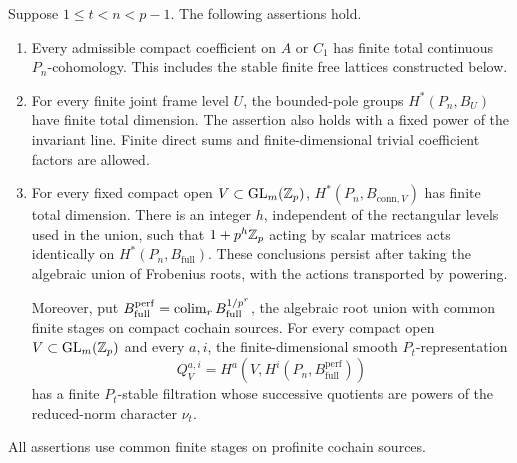 \begin{theorem}\label{thm:coefficient-finiteness}
Suppose $1\leq t<n<p-1$.  The following assertions hold.
\begin{enumerate}
\item Every admissible compact coefficient on $A$ or $C_1$ has finite
total continuous $P_n$-cohomology.  This includes the stable finite free
lattices constructed below.
\item For every finite joint frame level $U$, the bounded-pole groups
$H^*(P_n,B_U)$ have finite total dimension.  The assertion also
holds with a fixed power of the invariant line.  Finite direct
sums and finite-dimensional trivial coefficient factors are
allowed.
\item For every fixed compact open $V\subset\operatorname{GL}_m(\mathbb Z_p)$,
$H^*(P_n,B_{\mathrm{conn},V})$ has finite total dimension.  There is an
integer $h$, independent of the rectangular levels used in the union,
such that $1+p^h\mathbb Z_p$ acting by scalar matrices acts identically on
$H^*(P_n,B_{\mathrm{full}})$.  These conclusions persist after taking the
algebraic union of Frobenius roots, with the actions transported by
powering.

Moreover, put
$B_{\mathrm{full}}^{\mathrm{perf}}
 =\operatorname*{colim}_r B_{\mathrm{full}}^{1/p^r}$, the algebraic root union
with common finite stages on compact cochain sources.
For every compact open $V\subset\operatorname{GL}_m(\mathbb Z_p)$ and every $a,i$,
the finite-dimensional smooth $P_t$-representation
\[
 Q_{V}^{a,i}=
 H^a\!\left(V,H^i(P_n,B_{\mathrm{full}}^{\mathrm{perf}})\right)
\]
has a finite $P_t$-stable filtration whose successive quotients
are powers of the reduced-norm character $\nu_t$.
\end{enumerate}
All assertions use common finite stages on profinite cochain sources.
\end{theorem}


